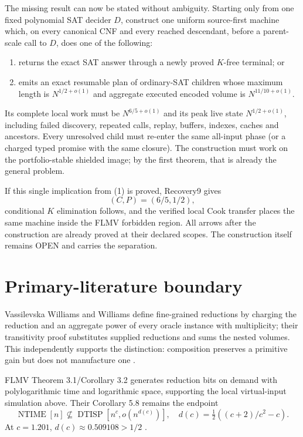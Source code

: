 \documentclass[11pt]{article}
\begin{document}
The missing result can now be stated without ambiguity.  Starting only from
one fixed polynomial SAT decider $D$, construct one uniform source-first
machine which, on every canonical CNF and every reached descendant, before a
parent-scale call to $D$, does one of the following:
\begin{enumerate}
 \item returns the exact SAT answer through a newly proved $K$-free terminal;
 or
 \item emits an exact resumable plan of ordinary-SAT children whose maximum
 length is $N^{1/2+o(1)}$ and aggregate executed encoded volume is
 $N^{11/10+o(1)}$.
\end{enumerate}
Its complete local work must be $N^{6/5+o(1)}$ and its peak live state
$N^{1/2+o(1)}$, including failed discovery, repeated calls, replay, buffers,
indexes, caches and ancestors.  Every unresolved child must re-enter the same
all-input phase (or a charged typed promise with the same closure).  The
construction must work on the portfolio-stable shielded image; by the first
theorem, that is already the general problem.

If this single implication from (1) is proved, Recovery9 gives
\[
 (C,P)=(6/5,1/2),                                      \tag{8}
\]
conditional $K$ elimination follows, and the verified local Cook transfer
places the same machine inside the FLMV forbidden region.  All arrows after
the construction are already proved at their declared scopes.  The
construction itself remains OPEN and carries the separation.

\section{Primary-literature boundary}

Vassilevska Williams and Williams define fine-grained reductions by charging
the reduction and an aggregate power of every oracle instance with
multiplicity; their transitivity proof substitutes supplied reductions and
sums the nested volumes.  This independently supports the distinction:
composition preserves a primitive gain but does not manufacture one
\cite{vww}.

FLMV Theorem 3.1/Corollary 3.2 generates reduction bits on demand with
polylogarithmic time and logarithmic space, supporting the local virtual-input
simulation above.  Their Corollary 5.8 remains the endpoint
\[
 \operatorname{NTIME}[n]\not\subseteq
 \operatorname{DTISP}\!\left[n^c,o(n^{d(c)})\right],
 \quad d(c)=\tfrac12((c+2)/c^2-c).                     \tag{9}
\]
At $c=1.201$, $d(c)\approx0.509108>1/2$ \cite{flmv}.
\end{document}
